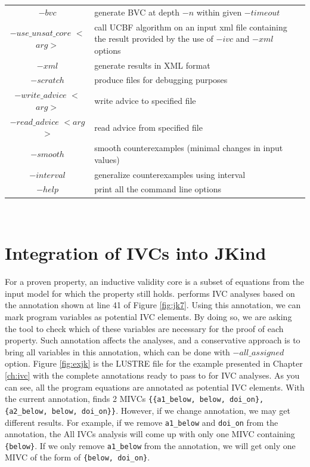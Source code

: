 \begin{table}
\begin{tabularx}{\linewidth}{|c|L|}
  \small{$-bvc$ }& \small{generate BVC at depth $-n$ within given $-timeout$} \\
  \small{$-use\_unsat\_core$ $<$$arg$$>$ }& \small{call UCBF algorithm on an input xml file containing the result provided by the use of $-ivc$ and $-xml$ options}\\[0.1ex]\hline
  \small{$-xml$} & \small{generate results in XML format}\\
  \small{$-scratch$} & \small{produce files for debugging purposes}\\[0.1ex]\hline
    \small{$-write\_advice$ $<$$arg$$>$} & \small{write advice to specified file}\\
  \small{$-read\_advice$ $<$$arg$$>$} & \small{read advice from specified file} \\[0.1ex]\hline
    \small{$-smooth$} & \small{smooth counterexamples (minimal changes in  input values)}\\
    \small{$-interval$} & \small{generalize counterexamples using interval}\\[0.1ex]\hline
  \small{$-help$ }& \small{print all the command line options} \\
  \hline
\end{tabularx}\\
\label{tab:jkindcm}
\end{table}

\section{Integration of IVCs into {\sc JKind}}

For a proven property, an inductive validity core is a subset of \lustre equations from the input model for which the property still
holds.  \jkind performs IVC analyses based on the annotation shown at line 41 of Figure \ref{fig:jk7}. Using this annotation, we can mark program variables as potential IVC elements. By doing so, we are asking the tool to check which of these variables are necessary for the proof of each property. Such annotation affects the analyses, and a conservative approach is to bring all variables in this annotation, which can be done with $-all\_assigned$ \jkind option.
Figure \ref{fig:exjk} is the LUSTRE file for the example presented in Chapter \ref{ch:ivc} with the complete annotations ready to pass to \jkind for IVC analyses. As you can see, all the program equations are annotated as potential IVC elements. With the current annotation, \jkind finds 2 MIVCs  {\small \texttt{\{\{a1\_below, below, doi\_on\}, \{a2\_below, below, doi\_on\}\}}}.
However, if we change annotation, we may get different results. For example, if we remove  {\small \texttt{a1\_below}} and {\small \texttt{doi\_on}} from the annotation, the All IVCs analysis will come up with only one
MIVC containing {\small \texttt{\{below\}}}. If we only remove {\small \texttt{a1\_below}} from the annotation, we will get only one MIVC of the form of {\small \texttt{\{below, doi\_on\}}}.

